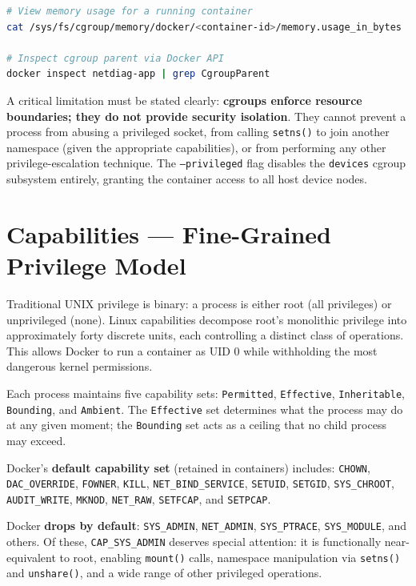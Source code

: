 \begin{lstlisting}[language=bash]
# View memory usage for a running container
cat /sys/fs/cgroup/memory/docker/<container-id>/memory.usage_in_bytes

# Inspect cgroup parent via Docker API
docker inspect netdiag-app | grep CgroupParent
\end{lstlisting}

A critical limitation must be stated clearly: \textbf{cgroups enforce resource
boundaries; they do not provide security isolation}. They cannot prevent a process
from abusing a privileged socket, from calling \texttt{setns()} to join another
namespace (given the appropriate capabilities), or from performing any other
privilege-escalation technique. The \texttt{--privileged} flag disables the
\texttt{devices} cgroup subsystem entirely, granting the container access to all host
device nodes.


\section{Capabilities --- Fine-Grained Privilege Model}
\label{sec:capabilities}

Traditional UNIX privilege is binary: a process is either root (all privileges) or
unprivileged (none). Linux capabilities decompose root's monolithic privilege into
approximately forty discrete units, each controlling a distinct class of operations.
This allows Docker to run a container as UID 0 while withholding the most dangerous
kernel permissions.

Each process maintains five capability sets: \texttt{Permitted}, \texttt{Effective},
\texttt{Inheritable}, \texttt{Bounding}, and \texttt{Ambient}. The \texttt{Effective}
set determines what the process may do at any given moment; the \texttt{Bounding} set
acts as a ceiling that no child process may exceed.

Docker's \textbf{default capability set} (retained in containers) includes:
\texttt{CHOWN}, \texttt{DAC\_OVERRIDE}, \texttt{FOWNER}, \texttt{KILL},
\texttt{NET\_BIND\_SERVICE}, \texttt{SETUID}, \texttt{SETGID}, \texttt{SYS\_CHROOT},
\texttt{AUDIT\_WRITE}, \texttt{MKNOD}, \texttt{NET\_RAW}, \texttt{SETFCAP}, and
\texttt{SETPCAP}.

Docker \textbf{drops by default}: \texttt{SYS\_ADMIN}, \texttt{NET\_ADMIN},
\texttt{SYS\_PTRACE}, \texttt{SYS\_MODULE}, and others. Of these,
\texttt{CAP\_SYS\_ADMIN} deserves special attention: it is functionally near-
equivalent to root, enabling \texttt{mount()} calls, namespace manipulation via
\texttt{setns()} and \texttt{unshare()}, and a wide range of other privileged
operations.

